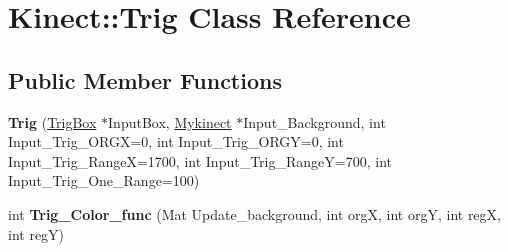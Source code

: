 \hypertarget{class_kinect_1_1_trig}{}\section{Kinect\+:\+:Trig Class Reference}
\label{class_kinect_1_1_trig}
\subsection*{Public Member Functions}
\begin{DoxyCompactItemize}
\item 
\mbox{\label{class_kinect_1_1_trig_a7d4515beaa06d1c4547425ac8c4c8492}} 
{\bfseries Trig} (\hyperlink{class_kinect_1_1_trig_box}{Trig\+Box} $\ast$Input\+Box, \hyperlink{class_kinect_1_1_mykinect}{Mykinect} $\ast$Input\+\_\+\+Background, int Input\+\_\+\+Trig\+\_\+\+O\+R\+GX=0, int Input\+\_\+\+Trig\+\_\+\+O\+R\+GY=0, int Input\+\_\+\+Trig\+\_\+\+RangeX=1700, int Input\+\_\+\+Trig\+\_\+\+RangeY=700, int Input\+\_\+\+Trig\+\_\+\+One\+\_\+\+Range=100)
\item 
\mbox{\label{class_kinect_1_1_trig_a40212345c95f71432d6b53f40cfe1ac3}} 
int {\bfseries Trig\+\_\+\+Color\+\_\+func} (Mat Update\+\_\+background, int orgX, int orgY, int regX, int regY)
\end{DoxyCompactItemize}
